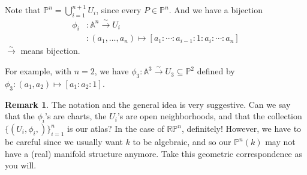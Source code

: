 \documentclass[12pt]{article}
\theoremstyle{definition}
\newtheorem*{remark}{Remark}
\begin{document}
Note that $\mathbb{P}^n=\bigcup\limits_{i=1}^{n+1}U_i$, since every $P\in\mathbb{P}^n$. And we have a bijection
\begin{equation}
    \begin{split}
        \phi_i&:\mathbb{A}^n\stackrel{\sim}{\longrightarrow}U_i\\
        &:(a_1,\dotsc,a_n)\mapsto[a_1:\cdots:a_{i-1}:1:a_i:\cdots:a_n]
    \end{split}
\end{equation}
$\stackrel{\sim}{\longrightarrow}$ means bijection.

For example, with $n=2$, we have $\phi_3:\mathbb{A}^3\stackrel{\sim}{\longrightarrow}U_3\subseteq\mathbb{P}^2$ defined by $\phi_3:(a_1,a_2)\mapsto[a_1:a_2:1]$.
\begin{remark}
   The notation and the general idea is very suggestive. Can we say that the $\phi_i$'s are charts, the $U_i$'s are open neighborhoods, and that the collection $\{(U_i,\phi_i,)\}_{i=1}^n$ is our atlas? In the case of $\mathbb{RP}^n$, definitely! However, we have to be careful since we usually want $k$ to be algebraic, and so our $\mathbb{P}^n(k)$ may not have a (real) manifold structure anymore. Take this geometric correspondence as you will.
\end{remark}
\end{document}
